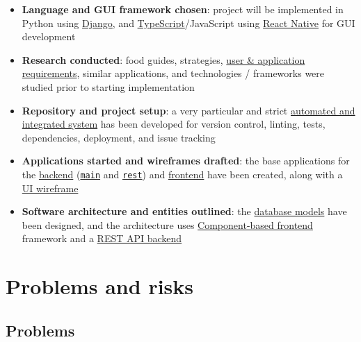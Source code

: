 \documentclass[11pt]{article}
\begin{document}
\begin{itemize}
    \tightlist
    \item \textbf{Language and GUI framework chosen}: project will be implemented in Python using \href{https://www.djangoproject.com/}{Django}, and \href{https://www.typescriptlang.org/}{TypeScript}/JavaScript using \href{https://reactnative.dev/}{React Native} for GUI development
    \item \textbf{Research conducted}: food guides, strategies, \href{https://github.com/ineshbose/portion-mate/wiki/Requirements}{user \& application requirements}, similar applications, and technologies / frameworks were studied prior to starting implementation
    \item \textbf{Repository and project setup}: a very particular and strict \href{https://github.com/ineshbose/portion-mate/tree/develop/.github}{automated and integrated system} has been developed for version control, linting, tests, dependencies, deployment, and issue tracking
    \item \textbf{Applications started and wireframes drafted}: the base applications for the \href{https://github.com/ineshbose/portion-mate/tree/develop/src/backend}{backend} (\href{https://github.com/ineshbose/portion-mate/tree/develop/src/backend/main}{\texttt{main}} and \href{https://github.com/ineshbose/portion-mate/tree/develop/src/backend/rest}{\texttt{rest}}) and \href{https://github.com/ineshbose/portion-mate/tree/develop/src/frontend}{frontend} have been created, along with a \href{https://github.com/ineshbose/portion-mate/wiki/Wireframes}{UI wireframe}
    \item \textbf{Software architecture and entities outlined}: the \href{https://github.com/ineshbose/portion-mate/blob/develop/src/backend/main/models.py}{database models} have been designed, and the architecture uses \href{https://reactnative.dev/docs/components-and-apis}{Component-based frontend} framework and a \href{https://www.django-rest-framework.org/}{REST API backend}
\end{itemize}

\section{Problems and risks}\label{problems-and-risks}

\subsection{Problems}\label{problems}
\end{document}
